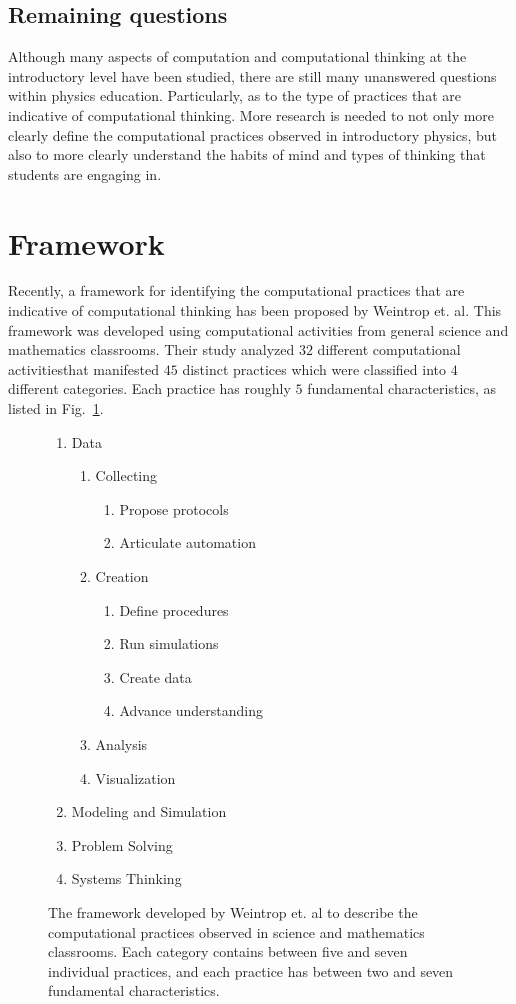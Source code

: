 \documentclass{msuphddissertation}
\begin{document}
\begin{doublespace}
\subsection{Remaining questions}

Although many aspects of computation and computational thinking at the introductory level have been studied, there are still many unanswered questions within physics education.  Particularly, as to the type of practices that are indicative of computational thinking.  More research is needed to not only more clearly define the computational practices observed in introductory physics, but also to more clearly understand the habits of mind and types of thinking that students are engaging in.

\section{Framework}

Recently, a framework for identifying the computational practices that are indicative of computational thinking has been proposed by Weintrop et. al.  This framework was developed using computational activities from general science and mathematics classrooms.  Their study analyzed $32$ different computational activitiesthat manifested $45$ distinct practices which were classified into $4$ different categories.  Each practice has roughly $5$ fundamental characteristics, as listed in Fig.~\ref{CH2:Framework}.

\begin{figure}
\center
\begin{enumerate}
\item Data
\begin{enumerate}
\item Collecting
\begin{enumerate}
\item Propose protocols
\item Articulate automation
\end{enumerate}
\item Creation
\begin{enumerate}
\item Define procedures
\item Run simulations
\item Create data
\item Advance understanding
\end{enumerate}
\item Analysis
\item Visualization
\end{enumerate}
\item Modeling and Simulation
\item Problem Solving
\item Systems Thinking
\end{enumerate}
\caption{The framework developed by Weintrop et. al to describe the computational practices observed in science and mathematics classrooms.  Each category contains between five and seven individual practices, and each practice has between two and seven fundamental characteristics.}\label{CH2:Framework}
\end{figure}


\end{doublespace}
\end{document}
